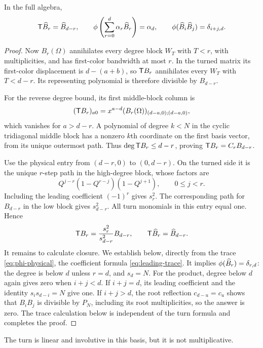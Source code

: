 \begin{proposition}\label{prop:newton-turn}
In the full algebra,
\begin{equation}\label{eq:newton-turn}
 \mathsf T\widehat B_r=\widehat B_{d-r},\qquad
 \phi\left(\sum_{r=0}^{d}\alpha_r\widehat B_r\right)=\alpha_d,
 \qquad
 \phi(\widehat B_i\widehat B_j)=\delta_{i+j,d}.
\end{equation}
\end{proposition}
\begin{proof}
Now $B_r(\Omega)$ annihilates every degree block $W_T$ with $T<r$, with multiplicities, and has first-color bandwidth at most $r$. In the turned matrix its first-color displacement is $d-(a+b)$, so $\mathsf T B_r$ annihilates every $W_T$ with $T<d-r$. Its representing polynomial is therefore divisible by $B_{d-r}$.

For the reverse degree bound, its first middle-block column is
\[
 (\mathsf T B_r)_{a0}=x^{a-d}(B_r(\Omega))_{(d-a,0);(d-a,0)},
\]
which vanishes for $a>d-r$. A polynomial of degree $k<N$ in the cyclic tridiagonal middle block has a nonzero $k$th coordinate on the first basis vector, from its unique outermost path. Thus $\deg\mathsf T B_r\le d-r$, proving $\mathsf T B_r=C_rB_{d-r}$.

Use the physical entry from $(d-r,0)$ to $(0,d-r)$. On the turned side it is the unique $r$-step path in the high-degree block, whose factors are
\[
 Q^{j-r}(1-Q^{r-j})(1-Q^{j+1}),\qquad0\le j<r.
\]
Including the leading coefficient $(-1)^r$ gives $s_r^2$. The corresponding path for $B_{d-r}$ in the low block gives $s_{d-r}^2$. All turn monomials in this entry equal one. Hence
\[
 \mathsf T B_r=\frac{s_r^2}{s_{d-r}^2}B_{d-r},
 \qquad \mathsf T\widehat B_r=\widehat B_{d-r}.
\]
It remains to calculate closure. We establish below, directly from
the trace \eqref{eq:phi-physical}, the coefficient formula
\eqref{eq:leading-trace}. It implies $\phi(\widehat B_r)=\delta_{r,d}$:
the degree is below $d$ unless $r=d$, and $s_d=N$. For the product,
degree below $d$ again gives zero when $i+j<d$. If $i+j=d$,
its leading coefficient and the identity $s_i s_{d-i}=N$ give one.
If $i+j>d$, the root reflection $c_{d-u}=c_u$ shows that
$B_iB_j$ is divisible by $P_N$, including its root multiplicities,
so the answer is zero. The trace calculation below is independent
of the turn formula and completes the proof.

\end{proof}
The turn is linear and involutive in this basis, but it is not multiplicative.


